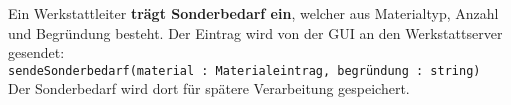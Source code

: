 Ein Werkstattleiter \textbf{trägt Sonderbedarf ein}, welcher aus Materialtyp, Anzahl und Begründung besteht. Der Eintrag wird von der GUI an den Werkstattserver gesendet:\\
\medskip
\texttt{sendeSonderbedarf(material : Materialeintrag, begründung : string)}
\\
\medskip
Der Sonderbedarf wird dort für spätere Verarbeitung gespeichert.